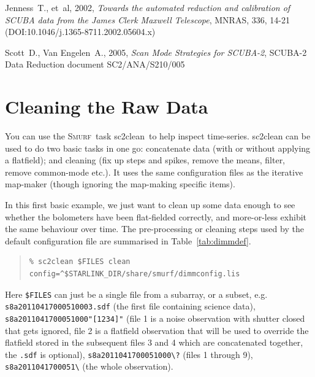 \documentclass[twoside,11pt]{article}
\newcommand{\htmladdnormallink}[2]{#1}
\newcommand{\htmlref}[2]{#1}
\newcommand{\latexhtml}[2]{#1}
\newcommand{\xref}[3]{#1}
\newcommand{\xlabel}[1]{}
\renewcommand{\_}{\texttt{\symbol{95}}}
\newenvironment{myquote}{\begin{quote}\begin{small}}{\end{small}\end{quote}}
\newcommand{\smurf}{\xref{\textsc{Smurf}}{sun258}{}}
\newcommand{\task}[1]{\textsf{#1}}
\newcommand{\clean}{\xref{\task{sc2clean}}{sun258}{SC2CLEAN}}
\newcommand{\cref}[3]{\latexhtml{#1~\ref{#2}}{\htmlref{#3}{#2}}}
\begin{document}
\begin{thebibliography}{}
Jenness~T., et~al, 2002, \htmladdnormallink{\textit{Towards the automated
reduction and calibration of SCUBA data from the James Clerk Maxwell
Telescope}}{http://dx.doi.org/10.1046/j.1365-8711.2002.05604.x},
MNRAS, 336, 14-21 (DOI:10.1046/j.1365-8711.2002.05604.x)

Scott~D., Van Engelen~A., 2005, \htmladdnormallink{\textit{Scan Mode Strategies for
SCUBA-2}}{http://docs.jach.hawaii.edu/JCMT/SC2/ANA/S210/005/sc2_ana_s210_005.ps},
SCUBA-2 Data Reduction document SC2/ANA/S210/005

\end{thebibliography}

\newpage
\appendix

\section{\xlabel{app_clean}Cleaning the Raw Data}
\label{app:clean}

You can use the \smurf\ task \clean\ to help inspect time-series.
\task{sc2clean} can be used to do two basic tasks in one go: concatenate data
(with or without applying a flatfield); and cleaning (fix up steps and
spikes, remove the means, filter, remove common-mode etc.). It uses
the same configuration files as the iterative map-maker (though
ignoring the map-making specific items).

In this first basic example, we just want to clean up some data enough
to see whether the bolometers have been flat-fielded correctly, and
more-or-less exhibit the same behaviour over time. The pre-processing
or cleaning steps used by the default configuration file are
summarised in \cref{Table}{tab:dimmdef}{this table}.

\begin{myquote}
\begin{verbatim}
% sc2clean $FILES clean config=^$STARLINK_DIR/share/smurf/dimmconfig.lis
\end{verbatim}
\end{myquote}

Here \texttt{\$FILES} can just be a single file from a subarray, or a
subset, e.g. \texttt{s8a20110417\_00051\_0003.sdf} (the first file
containing science data), \texttt{s8a20110417\_00051\_000"[1234]"}
(file 1 is a noise observation with shutter closed that gets ignored,
file 2 is a flatfield observation that will be used to override the
flatfield stored in the subsequent files 3 and 4 which are
concatenated together, the \texttt{.sdf} is optional),
\texttt{s8a20110417\_00051\_000\textbackslash?} (files 1 through 9),
\texttt{s8a20110417\_00051\_\textbackslash*} (the whole observation).
\end{document}
